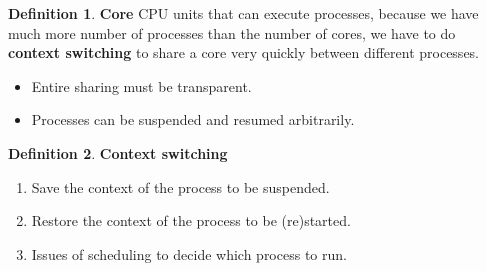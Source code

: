 \documentclass[12pt,a4paper]{article}
\theoremstyle{definition}
\newtheorem{definition}{Definition}[section]
\newenvironment{myitemize}
{ \begin{itemize}
    \setlength{\itemsep}{5pt}
    \setlength{\parskip}{0pt}
    \setlength{\parsep}{0pt}     }
{ \end{itemize}                  }
\newenvironment{myenumerate}
{ \begin{enumerate}
    \setlength{\itemsep}{5pt}
    \setlength{\parskip}{0pt}
    \setlength{\parsep}{0pt}     }
{ \end{enumerate}                }
\begin{document}
\begin{definition}{\textbf{Core}}
	CPU units that can execute processes, because we have much more number of processes than the number of cores, we have to do \textbf{context switching} to share a core very quickly between different processes.
	\begin{myitemize}
		\item Entire sharing must be transparent.
		\item Processes can be suspended and resumed arbitrarily.
	\end{myitemize}
\end{definition}

\begin{definition}{\textbf{Context switching}}
	\begin{myenumerate}
		\item Save the \textsf{context} of the process to be suspended.
		\item Restore the \textsf{context} of the process to be (re)started.
		\item Issues of \textsf{scheduling} to decide which process to run.
	\end{myenumerate}
\end{definition}
\end{document}
